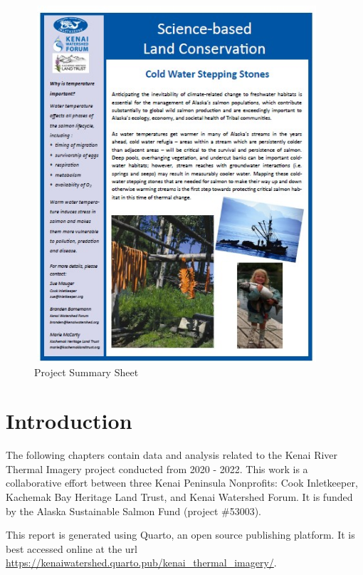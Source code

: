 \documentclass[
  letterpaper,
  DIV=11,
  numbers=noendperiod]{scrreprt}
\begin{document}
\begin{figure}

{\centering \includegraphics[width=4.16667in,height=5.20833in]{./images/project_summary_img.jpg}

}

\caption{\label{fig-summary-sheet}Project Summary Sheet}

\end{figure}


\hypertarget{introduction}{%
\chapter{Introduction}\label{introduction}}

The following chapters contain data and analysis related to the Kenai
River Thermal Imagery project conducted from 2020 - 2022. This work is a
collaborative effort between three Kenai Peninsula Nonprofits: Cook
Inletkeeper, Kachemak Bay Heritage Land Trust, and Kenai Watershed
Forum. It is funded by the Alaska Sustainable Salmon Fund (project
\#53003).

This report is generated using Quarto, an open source publishing
platform. It is best accessed online at the url
\url{https://kenaiwatershed.quarto.pub/kenai_thermal_imagery/}.
\end{document}
